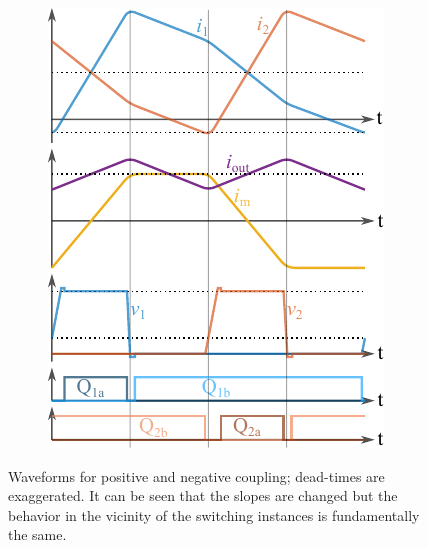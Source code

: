 \documentclass{IPEC2026}
\begin{document}
\begin{figure}
\begin{subfigure}[c]{0.48\columnwidth}
      \includegraphics[width=\textwidth]{figures/Inkscape/Waveforms_positive.pdf}
      \label{fig:waveform_posCoupling}
    \end{subfigure}
  \caption{Waveforms for positive and negative coupling; dead-times are exaggerated. It can be seen that the slopes are changed but the behavior in the vicinity of the switching instances is fundamentally the same.}
  \label{fig:waveform_Coupling}
\end{figure}
\end{document}
